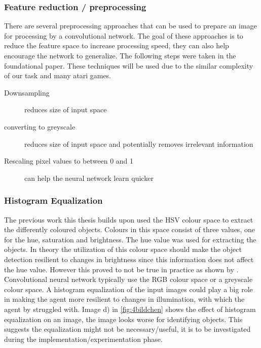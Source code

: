 \subsubsection{Feature reduction / preprocessing}

There are several preprocessing approaches that can be used to prepare an image for processing by a convolutional network. The goal of these approaches is to reduce the feature space to increase processing speed, they can also help encourage the network to generalize. The following steps were taken in the foundational \autocite{atari} paper. These techniques will be used due to the similar complexity of our task and many atari games.

\begin{description}
     \item[Downsampling] reduces size of input space
     \item[converting to greyscale] reduces size of input space and potentially removes irrelevant information
     \item[Rescaling pixel values to between 0 and 1] can help the neural network learn quicker %
\end{description}


\subsubsection{Histogram Equalization}

The previous work this thesis builds upon used the HSV colour space to extract the differently coloured objects. Colours in this space consist of three values, one for the hue, saturation and brightness. The hue value was used for extracting the objects. In theory the utilization of this colour space should make the object detection resilient to changes in brightness since this information does not affect the hue value. However this proved to not be true in practice as shown by \autocite{maximilian}.
Convolutional neural network typically use the RGB colour space or a greyscale colour space. A histogram equalization of the input images could play a big role in making the agent more resilient to changes in illumination, with which the agent by \autocite{maximilian} struggled with. Image d) in \ref{fig:4bildchen} shows the effect of histogram equalization on an image, the image looks worse for identifying objects. This suggests the equalization might not be necessary/useful, it is to be investigated during the implementation/experimentation phase.


